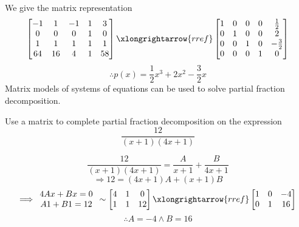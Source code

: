 We give the matrix representation
$$\begin{bmatrix}
	-1&1&-1&1&3\\0&0&0&1&0\\1&1&1&1&1\\64&16&4&1&58
\end{bmatrix}\xlongrightarrow{rref}\begin{bmatrix}
1&0&0&0&\frac{1}{2}\\0&1&0&0&2\\0&0&1&0&-\frac{3}{2}\\0&0&0&1&0
\end{bmatrix}$$
$$\therefore p(x)=\frac{1}{2}x^3+2x^2-\frac{3}{2}x$$
Matrix models of systems of equations can be used to solve partial fraction decomposition.
\begin{exercise}
	Use a matrix to complete partial fraction decomposition on the expression
	\[
		\frac{12}{(x+1)(4x+1)}
	\]
\end{exercise}
\begin{solution}
	\[
		\frac{12}{(x+1)(4x+1)}=\frac{A}{x+1}+\frac{B}{4x+1}
	\]
	\[
		\Longrightarrow 12=(4x+1)A +(x+1)B
	\]
	\[
		\Longrightarrow \begin{array}{c}
			4Ax + Bx = 0\\
			A1+B1=12			
		\end{array}\sim \begin{bmatrix}
			4 &1  &0   \\
			 1&1  &12   \\
		\end{bmatrix}\xlongrightarrow{rref} \begin{bmatrix}
			1 &0  &-4   \\
			 0&1  &16   \\
		\end{bmatrix}
	\]
	\[
		\therefore A=-4 \land B=16
	\]
\end{solution}